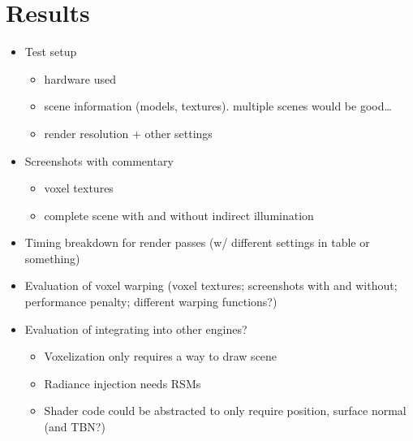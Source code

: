 \chapter{Results}

\begin{itemize}
    \item Test setup
    \begin{itemize}
        \item hardware used
        \item scene information (models, textures). multiple scenes would be good\ldots
        \item render resolution + other settings
    \end{itemize}
    \item Screenshots with commentary
    \begin{itemize}
        \item voxel textures
        \item complete scene with and without indirect illumination
    \end{itemize}
    \item Timing breakdown for render passes (w/ different settings in table or something)
    \item Evaluation of voxel warping (voxel textures; screenshots with and without; performance penalty; different warping functions?)
    \item Evaluation of integrating into other engines?
    \begin{itemize}
        \item Voxelization only requires a way to draw scene
        \item Radiance injection needs RSMs
        \item Shader code could be abstracted to only require position, surface normal (and TBN?)
    \end{itemize}
\end{itemize}
